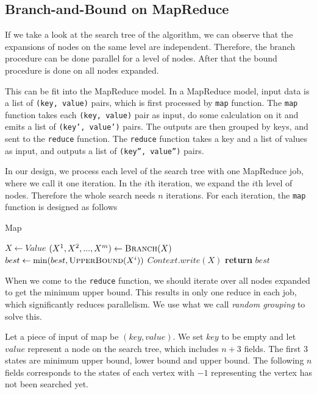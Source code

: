 \subsection{Branch-and-Bound on MapReduce}
    If we take a look at the search tree of the algorithm, we can observe that the expansions of nodes on the same level are independent. Therefore, the branch procedure can be done parallel for a level of nodes. After that the bound procedure is done on all nodes expanded.

    This can be fit into the MapReduce model. In a MapReduce model, input data is a list of \texttt{(key, value)} pairs, which is first processed by \texttt{map} function. The \texttt{map} function takes each \texttt{(key, value)} pair as input, do some calculation on it and emits a list of \texttt{(key', value')} pairs. The outputs are then grouped by keys, and sent to the \texttt{reduce} function. The \texttt{reduce} function takes a key and a list of values as input, and outputs a list of \texttt{(key'', value'')} pairs.

    In our design, we process each level of the search tree with one MapReduce job, where we call it one iteration. In the $i$th iteration, we expand the $i$th level of nodes. Therefore the whole search needs $n$ iterations. For each iteration, the \texttt{map} function is designed as follows
\begin{algorithm}
\caption{Map}
\begin{algorithmic}[1]
    \State $X \gets Value$
    \State $(X^1,X^2,...,X^m) \gets \textsc{Branch}(X)$
        \State $best \gets \min(best, \textsc{UpperBound}(X^i))$
    \EndFor
            \State $Context.write(X)$
        \EndIf
    \EndFor
    \State \textbf{return }$best$
\EndFunction
\end{algorithmic}
\end{algorithm}
\newpage

    When we come to the \texttt{reduce} function, we should iterate over all nodes expanded to get the minimum upper bound. This results in only one reduce in each job, which significantly {\color{red} reduces} parallelism. We use what we call \textit{random grouping} to solve this.

    Let a piece of input of map be $(key, value)$. We set $key$ to be empty and let $value$ represent a node on the search tree, which includes $n+3$ fields. The first $3$ states are minimum upper bound, lower bound and upper bound. The following $n$ fields corresponds to the states of each vertex with $-1$ representing the vertex has not been searched yet.

